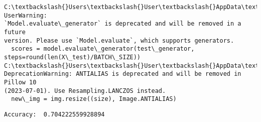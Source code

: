 \documentclass[11pt]{article}
\begin{document}
    \begin{Verbatim}[commandchars=\\\{\}]
C:\textbackslash{}Users\textbackslash{}User\textbackslash{}AppData\textbackslash{}Local\textbackslash{}Temp\textbackslash{}ipykernel\_46608\textbackslash{}1622692593.py:4: UserWarning:
`Model.evaluate\_generator` is deprecated and will be removed in a future
version. Please use `Model.evaluate`, which supports generators.
  scores = model.evaluate\_generator(test\_generator,
steps=round(len(X\_test)/BATCH\_SIZE))
C:\textbackslash{}Users\textbackslash{}User\textbackslash{}AppData\textbackslash{}Local\textbackslash{}Temp\textbackslash{}ipykernel\_46608\textbackslash{}3032259505.py:16:
DeprecationWarning: ANTIALIAS is deprecated and will be removed in Pillow 10
(2023-07-01). Use Resampling.LANCZOS instead.
  new\_img = img.resize((size), Image.ANTIALIAS)
    \end{Verbatim}

    \begin{Verbatim}[commandchars=\\\{\}]
Accuracy:  0.704222559928894
    \end{Verbatim}


    
    
    
\end{document}
